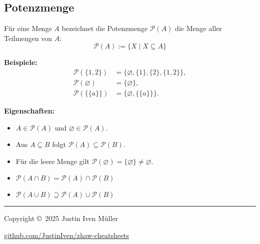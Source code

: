 \documentclass[10pt,landscape]{article}
\begin{document}
\begin{multicols*}{4}
\subsection{Potenzmenge}
Für eine Menge \(A\) bezeichnet die Potenzmenge \( \mathcal{P}(A) \) die Menge aller Teilmengen von \(A\):
\[
\mathcal{P}(A):=\{X \mid X\subseteq A\}
\]

\textbf{Beispiele:}
\begin{align*}
\mathcal{P}(\{1,2\}) &= \{\varnothing,\{1\},\{2\},\{1,2\}\},\\
\mathcal{P}(\varnothing) &= \{\varnothing\},\\
\mathcal{P}(\{\{a\}\}) &= \{\varnothing,\{\{a\}\}\}.
\end{align*}

\textbf{Eigenschaften:}
\begin{itemize}
  \item \(A\in\mathcal{P}(A)\) und \(\varnothing\in\mathcal{P}(A)\).
  \item Aus \(A\subseteq B\) folgt \(\mathcal{P}(A)\subseteq\mathcal{P}(B)\).
  \item Für die leere Menge gilt \(\mathcal{P}(\varnothing)=\{\varnothing\}\neq\varnothing\).
  \item \(\mathcal{P}(A\cap B)=\mathcal{P}(A)\cap\mathcal{P}(B)\)
  \item \(\mathcal{P}(A\cup B)\supseteq \mathcal{P}(A)\cup\mathcal{P}(B)\)
\end{itemize}




\vspace{1cm}

\rule{0.3\linewidth}{0.25pt}
\scriptsize

Copyright \copyright\ 2025 Justin Iven Müller

\href{https://github.com/JustinIven/zhaw-cheatsheets}{github.com/JustinIven/zhaw-cheatsheets}


\end{multicols*}
\end{document}

